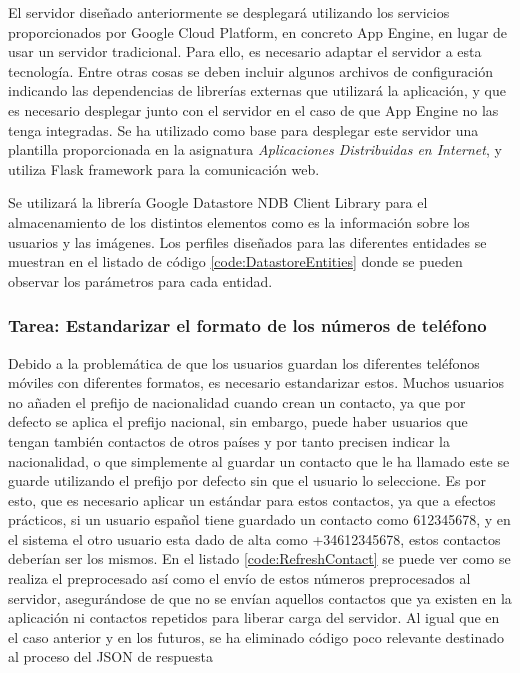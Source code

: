 El servidor diseñado anteriormente se desplegará utilizando los servicios proporcionados por Google Cloud Platform, en concreto App Engine, en lugar de usar un servidor tradicional. Para ello, es necesario adaptar el servidor a esta tecnología. Entre otras cosas se deben incluir algunos archivos de configuración indicando las dependencias de librerías externas que utilizará la aplicación, y que es necesario desplegar junto con el servidor en el caso de que App Engine no las tenga integradas. Se ha utilizado como base para desplegar este servidor una plantilla proporcionada en la asignatura \textit{Aplicaciones Distribuidas en Internet}, y utiliza Flask framework para la comunicación web.

Se utilizará la librería Google Datastore NDB Client Library para el almacenamiento de los distintos elementos como es la información sobre los usuarios y las imágenes. Los perfiles diseñados para las diferentes entidades se muestran en el listado de código \ref{code:DatastoreEntities} donde se pueden observar los parámetros para cada entidad.




\subsubsection{Tarea: Estandarizar el formato de los números de teléfono} 

Debido a la problemática de que los usuarios guardan los diferentes teléfonos móviles con diferentes formatos, es necesario estandarizar estos. Muchos usuarios no añaden el prefijo de nacionalidad cuando crean un contacto, ya que por defecto se aplica el prefijo nacional, sin embargo, puede haber usuarios que tengan también contactos de otros países y por tanto precisen indicar la nacionalidad, o que simplemente al guardar un contacto que le ha llamado este se guarde utilizando el prefijo por defecto sin que el usuario lo seleccione. Es por esto, que es necesario aplicar un estándar para estos contactos, ya que a efectos prácticos, si un usuario español tiene guardado un contacto como 612345678, y en el sistema el otro usuario esta dado de alta como +34612345678, estos contactos deberían ser los mismos. En el listado \ref{code:RefreshContact} se puede ver como se realiza el preprocesado así como el envío de estos números preprocesados al servidor, asegurándose de que no se envían aquellos contactos que ya existen en la aplicación ni contactos repetidos para liberar carga del servidor. Al igual que en el caso anterior y en los futuros, se ha eliminado código poco relevante destinado al proceso del JSON de respuesta


